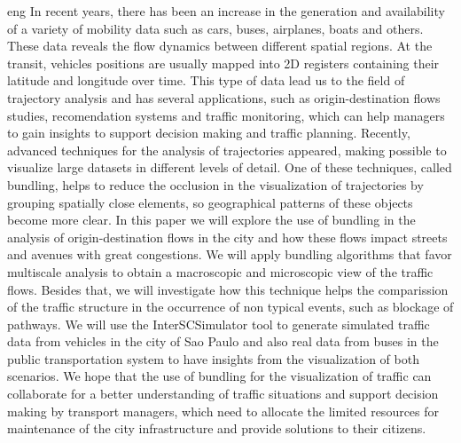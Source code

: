 \begin{resumo}{eng} 
In recent years, there has been an increase in the generation and availability
of a variety of mobility data such as cars, buses, airplanes, boats and others.
These data reveals the flow dynamics between different spatial regions. At the
transit, vehicles positions are usually mapped into 2D registers containing
their latitude and longitude over time.  This type of data lead us to the field
of trajectory analysis and has several applications, such as origin-destination
flows studies, recomendation systems and traffic monitoring, which can help
managers to gain insights to support decision making and traffic planning.
Recently, advanced techniques for the analysis of trajectories appeared, making
possible to visualize large datasets in different levels of detail.  One of
these techniques, called bundling, helps to reduce the occlusion in the
visualization of trajectories by grouping spatially close elements, so
geographical patterns of these objects become more clear.  In this paper we
will explore the use of bundling in the analysis of origin-destination flows in
the city and how these flows impact streets and avenues with great congestions.
We will apply bundling algorithms that favor multiscale analysis to obtain a
macroscopic and microscopic view of the traffic flows. Besides that, we will
investigate how this technique helps the comparission of the traffic structure
in the occurrence of non typical events, such as blockage of pathways. We will
use the InterSCSimulator tool to generate simulated traffic data from vehicles
in the city of Sao Paulo and also real data from buses in the public
transportation system to have insights from the visualization of both
scenarios.  We hope that the use of bundling for the visualization of traffic
can collaborate for a better understanding of traffic situations and support
decision making by transport managers, which need to allocate the limited
resources for maintenance of the city infrastructure and provide solutions to
their citizens.
\end{resumo}
